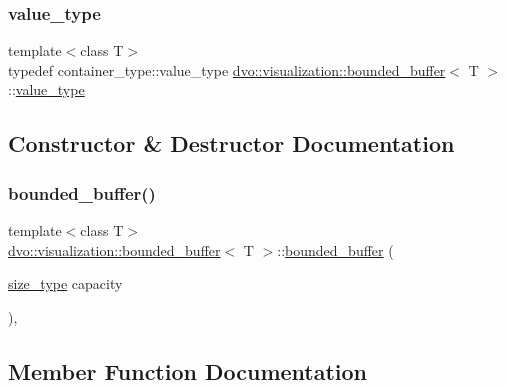 \subsubsection{\texorpdfstring{value\+\_\+type}{value\_type}}
{\footnotesize\ttfamily template$<$class T$>$ \\
typedef container\+\_\+type\+::value\+\_\+type \mbox{\hyperlink{classdvo_1_1visualization_1_1bounded__buffer}{dvo\+::visualization\+::bounded\+\_\+buffer}}$<$ T $>$\+::\mbox{\hyperlink{classdvo_1_1visualization_1_1bounded__buffer_a69f22957276557660f1bf8b654e3a667}{value\+\_\+type}}}



\subsection{Constructor \& Destructor Documentation}
\mbox{\label{classdvo_1_1visualization_1_1bounded__buffer_a392dce467c80a3b980be50ed2f538181}} 
\subsubsection{\texorpdfstring{bounded\+\_\+buffer()}{bounded\_buffer()}}
{\footnotesize\ttfamily template$<$class T$>$ \\
\mbox{\hyperlink{classdvo_1_1visualization_1_1bounded__buffer}{dvo\+::visualization\+::bounded\+\_\+buffer}}$<$ T $>$\+::\mbox{\hyperlink{classdvo_1_1visualization_1_1bounded__buffer}{bounded\+\_\+buffer}} (\begin{DoxyParamCaption}\item[{\mbox{\hyperlink{classdvo_1_1visualization_1_1bounded__buffer_a0b8808bbfd4de59ebf33d5241083179c}{size\+\_\+type}}}]{capacity }\end{DoxyParamCaption})\hspace{0.3cm}{\ttfamily [inline]}, {\ttfamily [explicit]}}



\subsection{Member Function Documentation}
\mbox{\label{classdvo_1_1visualization_1_1bounded__buffer_a86bb8a4d2211061d0dda2cbf9a9a82e7}} 
